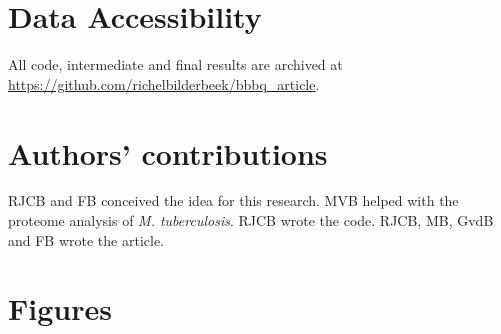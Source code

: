 \section{Data Accessibility}

All code, intermediate and final results are archived at 
\url{https://github.com/richelbilderbeek/bbbq_article}.

\section{Authors' contributions}

RJCB and FB conceived the idea for this research. 
MVB helped with the proteome analysis of \emph{M. tuberculosis}.
RJCB wrote the code.
RJCB, MB, GvdB and FB wrote the article.


%


\newpage
\section{Figures}

\newpage

\thispagestyle{empty}

